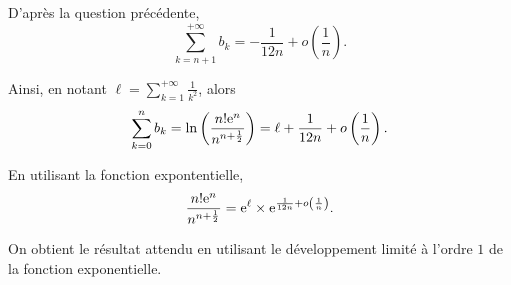\begin{elemdemo}
\begin{reponses}
\item D'après la question précédente,
\[
\sum_{k=n+1}^{+\infty} b_k = -\frac{1}{12 n} + o\left(\frac{1}{n}\right).
\]

Ainsi, en notant $\ell = \sum_{k=1}^{+\infty} \frac{1}{k^2}$, alors
\[
\sum_{k=0}^n b_k = \ln\left(\frac{n! \mathrm{e}^n}{n^{n+\frac{1}{2}}}\right) = \ell + \frac{1}{12 n} + o\left(\frac{1}{n}\right).
\]

En utilisant la fonction expontentielle,
\[
\frac{n! \mathrm{e}^n}{n^{n+\frac{1}{2}}} = \mathrm{e}^{\ell} \times \mathrm{e}^{\frac{1}{12 n} + o\left(\frac{1}{n}\right)}.
\]

On obtient le résultat attendu en utilisant le développement limité à l'ordre $1$ de la fonction exponentielle.
\end{reponses}
\end{elemdemo}

